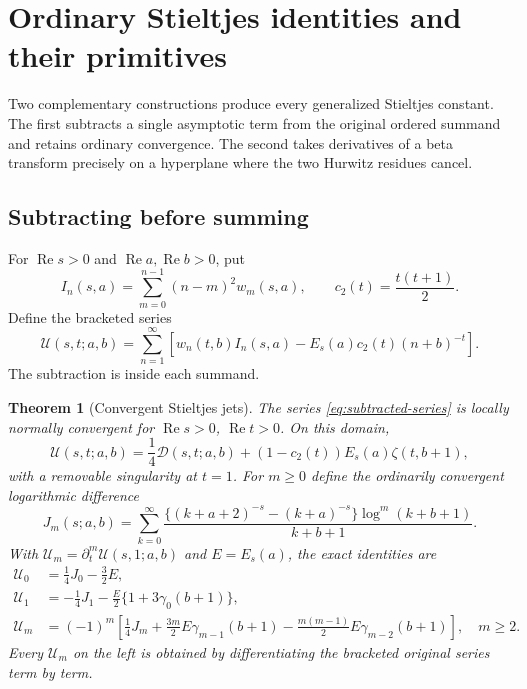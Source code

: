 \documentclass[11pt,a4paper]{article}
\numberwithin{equation}{section}
\newtheorem{theorem}{Theorem}[section]
\theoremstyle{definition}
\theoremstyle{remark}
\newcommand{\Rea}{\operatorname{Re}}
\newcommand{\Def}{\mathcal D}
\begin{document}
\section{Ordinary Stieltjes identities and their primitives}
\label{sec:stieltjes}

Two complementary constructions produce every generalized Stieltjes
constant. The first subtracts a single asymptotic term from the original
ordered summand and retains ordinary convergence. The second takes
derivatives of a beta transform precisely on a hyperplane where the
two Hurwitz residues cancel.

\subsection{Subtracting before summing}

For $\Rea s>0$ and $\Rea a,\Rea b>0$, put
\[
 I_n(s,a)=\sum_{m=0}^{n-1}(n-m)^2w_m(s,a),\qquad
 c_2(t)=\frac{t(t+1)}2.
\]
Define the bracketed series
\begin{equation}\label{eq:subtracted-series}
 \mathcal U(s,t;a,b)=
 \sum_{n=1}^{\infty}
 \left[
 w_n(t,b)I_n(s,a)-E_s(a)c_2(t)(n+b)^{-t}
 \right].
\end{equation}
The subtraction is inside each summand.

\begin{theorem}[Convergent Stieltjes jets]\label{thm:subtracted-jets}
The series \eqref{eq:subtracted-series} is locally normally convergent
for $\Rea s>0$, $\Rea t>0$. On this domain,
\begin{equation}\label{eq:subtracted-identity}
 \mathcal U(s,t;a,b)=\frac14\Def(s,t;a,b)
       +(1-c_2(t))E_s(a)\zeta(t,b+1),
\end{equation}
with a removable singularity at $t=1$.
For $m\ge0$ define the ordinarily convergent logarithmic difference
\begin{equation}\label{eq:j-m}
 J_m(s;a,b)=\sum_{k=0}^{\infty}
 \frac{\{(k+a+2)^{-s}-(k+a)^{-s}\}
                 \log^m(k+b+1)}{k+b+1}.
\end{equation}
With $\mathcal U_m=\partial_t^m\mathcal U(s,1;a,b)$ and
$E=E_s(a)$, the exact identities are
\begin{align}
 \mathcal U_0&=\frac14J_0-\frac32E,\label{eq:u-zero}\\
 \mathcal U_1&=-\frac14J_1-\frac E2\{1+3\gamma_0(b+1)\},
 \label{eq:u-one}\\
 \mathcal U_m&=(-1)^m\left[
 \frac14J_m+\frac{3m}{2}E\gamma_{m-1}(b+1)
 -\frac{m(m-1)}2E\gamma_{m-2}(b+1)
 \right],\quad m\ge2.
 \label{eq:u-all}
\end{align}
Every $\mathcal U_m$ on the left is obtained by differentiating the
bracketed original series term by term.
\end{theorem}
\end{document}
